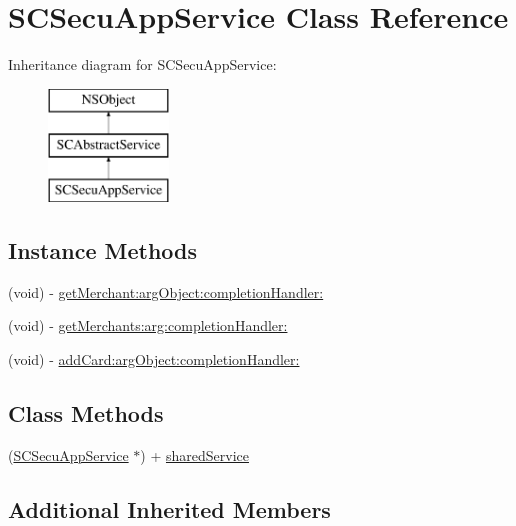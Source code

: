 \hypertarget{interface_s_c_secu_app_service}{}\section{S\+C\+Secu\+App\+Service Class Reference}
\label{interface_s_c_secu_app_service}
Inheritance diagram for S\+C\+Secu\+App\+Service\+:\begin{figure}[H]
\begin{center}
\leavevmode
\includegraphics[height=3.000000cm]{interface_s_c_secu_app_service}
\end{center}
\end{figure}
\subsection*{Instance Methods}
\begin{DoxyCompactItemize}
\item 
(void) -\/ \hyperlink{interface_s_c_secu_app_service_a6451375bc06f1f698efda57b71cf6d58}{get\+Merchant\+:arg\+Object\+:completion\+Handler\+:}
\item 
(void) -\/ \hyperlink{interface_s_c_secu_app_service_a25ce19cf038b0bd32970b8b2e0043258}{get\+Merchants\+:arg\+:completion\+Handler\+:}
\item 
(void) -\/ \hyperlink{interface_s_c_secu_app_service_a537b23b2d47062977d1547f6b022e46b}{add\+Card\+:arg\+Object\+:completion\+Handler\+:}
\end{DoxyCompactItemize}
\subsection*{Class Methods}
\begin{DoxyCompactItemize}
\item 
(\hyperlink{interface_s_c_secu_app_service}{S\+C\+Secu\+App\+Service} $\ast$) + \hyperlink{interface_s_c_secu_app_service_a10a2e0c5d6288c9e36814bc8663614d0}{shared\+Service}
\end{DoxyCompactItemize}
\subsection*{Additional Inherited Members}


